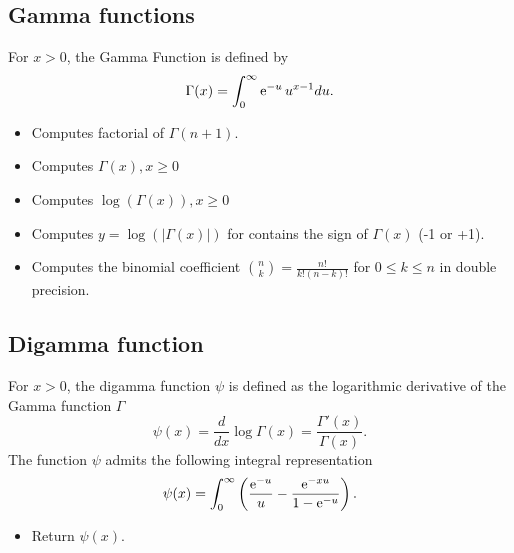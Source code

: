 \subsection{Gamma functions}

For $x>0$, the Gamma Function is defined by
\begin{equation*}
  \Gamma(x)=\int_0^{\infty} \operatorname{e}^{ -u } u^{x-1} du.
\end{equation*}

\begin{itemize}
\item {}
  \sshortdescribe   Computes factorial of  $ \Gamma (n+1)$.
\item {}
  \sshortdescribe   Computes $\Gamma(x), x \geq 0$
\item {}
  \sshortdescribe   Computes $\log(\Gamma(x)), x \geq 0$
\item {}
  \sshortdescribe   Computes $y = \log(|\Gamma(x)|)$ for  
  contains the sign of $\Gamma(x)$ (-1 or +1).
\item {}
  \sshortdescribe Computes the binomial coefficient $\binom{n}{k} = 
  \frac{n!}{k! (n-k)!}$ for $0 \le k \le n$ in double precision.
\end{itemize}

\subsection{Digamma function}

For $x>0$, the digamma function $\psi$ is defined as the logarithmic derivative of the
Gamma function $\Gamma$
\begin{equation*}
  \psi(x) = \frac{d}{dx} \log \Gamma (x) = \frac{\Gamma'(x)}{\Gamma(x)}.
\end{equation*}
The function $\psi$ admits the following integral representation
\begin{equation*}
  \psi (x) = \int_{0}^{\infty} \left( \frac{\operatorname{e}^{ -u }}{u} - \frac{\operatorname{e}^{ -xu }}{1
  - \operatorname{e}^{ -u }} \right).
\end{equation*}

\begin{itemize}
  \item {}
    \sshortdescribe Return $\psi(x)$.
\end{itemize}

